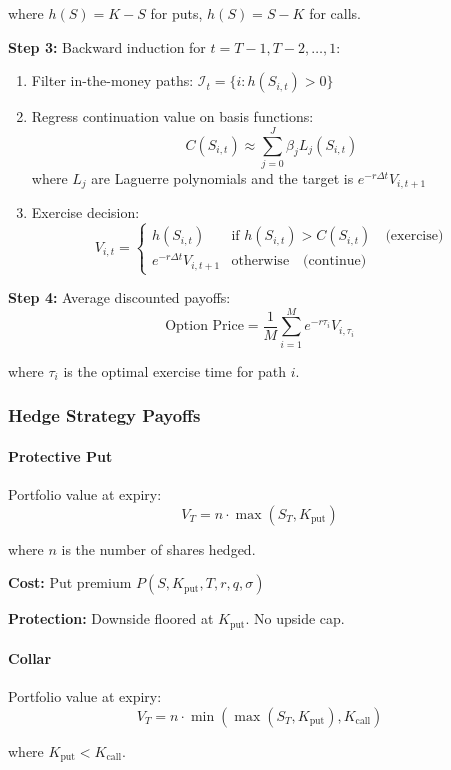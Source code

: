 where $h(S) = K - S$ for puts, $h(S) = S - K$ for calls.

\textbf{Step 3:} Backward induction for $t = T-1, T-2, \ldots, 1$:
\begin{enumerate}
  \item Filter in-the-money paths: $\mathcal{I}_t = \{ i : h(S_{i,t}) > 0 \}$
  \item Regress continuation value on basis functions:
  \[
  C(S_{i,t}) \approx \sum_{j=0}^{J} \beta_j L_j(S_{i,t})
  \]
  where $L_j$ are Laguerre polynomials and the target is $e^{-r\Delta t} V_{i,t+1}$
  \item Exercise decision:
  \[
  V_{i,t} = \begin{cases}
  h(S_{i,t}) & \text{if } h(S_{i,t}) > C(S_{i,t}) \quad \text{(exercise)} \\
  e^{-r\Delta t} V_{i,t+1} & \text{otherwise} \quad \text{(continue)}
  \end{cases}
  \]
\end{enumerate}

\textbf{Step 4:} Average discounted payoffs:
\[
\text{Option Price} = \frac{1}{M} \sum_{i=1}^{M} e^{-r \tau_i} V_{i,\tau_i}
\]

where $\tau_i$ is the optimal exercise time for path $i$.

\subsubsection{Hedge Strategy Payoffs}

\paragraph{Protective Put}

Portfolio value at expiry:
\[
V_T = n \cdot \max(S_T, K_{\text{put}})
\]

where $n$ is the number of shares hedged.

\textbf{Cost:} Put premium $P(S, K_{\text{put}}, T, r, q, \sigma)$

\textbf{Protection:} Downside floored at $K_{\text{put}}$. No upside cap.

\paragraph{Collar}

Portfolio value at expiry:
\[
V_T = n \cdot \min\left(\max(S_T, K_{\text{put}}), K_{\text{call}}\right)
\]

where $K_{\text{put}} < K_{\text{call}}$.

